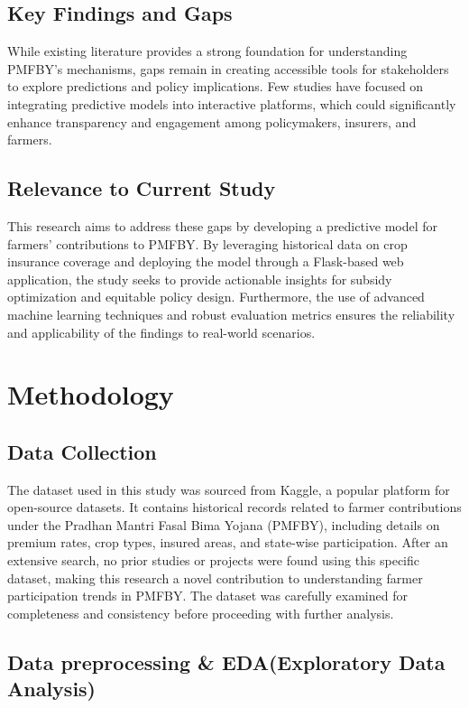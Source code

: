 \documentclass[12pt]{article}
\begin{document}
\subsection{Key Findings and Gaps}
While existing literature provides a strong foundation for understanding PMFBY's mechanisms, gaps remain in creating accessible tools for stakeholders to explore predictions 
and policy implications. Few studies have focused on integrating predictive models into interactive platforms, which could significantly enhance transparency and engagement among policymakers, insurers, and farmers.
\subsection{Relevance to Current Study}
This research aims to address these gaps by developing a predictive model for farmers' contributions to PMFBY. By leveraging historical data on crop insurance coverage and 
deploying the model through a Flask-based web application, the study seeks to provide actionable insights for subsidy optimization and equitable policy design. 
Furthermore, the use of advanced machine learning techniques and robust evaluation metrics ensures the reliability and applicability of the findings to real-world scenarios.
\section{Methodology}
\subsection{Data Collection}
The dataset used in this study was sourced from Kaggle, a popular platform for open-source datasets. It contains historical records related to farmer contributions under the 
Pradhan Mantri Fasal Bima Yojana (PMFBY), including details on premium rates, crop types, insured areas, and state-wise participation. After an extensive search, no prior studies 
or projects were found using this specific dataset, making this research a novel contribution to understanding farmer participation trends in PMFBY. 
The dataset was carefully examined for completeness and consistency before proceeding with further analysis.
\subsection{Data preprocessing \& EDA(Exploratory Data \\Analysis) }
\end{document}
